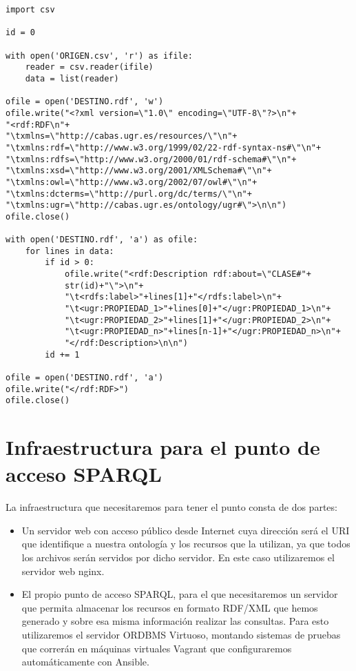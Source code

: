 \newpage
\begin{verbatim}
import csv

id = 0

with open('ORIGEN.csv', 'r') as ifile:
    reader = csv.reader(ifile)
    data = list(reader)

ofile = open('DESTINO.rdf', 'w')
ofile.write("<?xml version=\"1.0\" encoding=\"UTF-8\"?>\n"+
"<rdf:RDF\n"+
"\txmlns=\"http://cabas.ugr.es/resources/\"\n"+
"\txmlns:rdf=\"http://www.w3.org/1999/02/22-rdf-syntax-ns#\"\n"+
"\txmlns:rdfs=\"http://www.w3.org/2000/01/rdf-schema#\"\n"+
"\txmlns:xsd=\"http://www.w3.org/2001/XMLSchema#\"\n"+
"\txmlns:owl=\"http://www.w3.org/2002/07/owl#\"\n"+
"\txmlns:dcterms=\"http://purl.org/dc/terms/\"\n"+
"\txmlns:ugr=\"http://cabas.ugr.es/ontology/ugr#\">\n\n")
ofile.close()

with open('DESTINO.rdf', 'a') as ofile:
    for lines in data:
        if id > 0:
            ofile.write("<rdf:Description rdf:about=\"CLASE#"+
            str(id)+"\">\n"+
            "\t<rdfs:label>"+lines[1]+"</rdfs:label>\n"+
            "\t<ugr:PROPIEDAD_1>"+lines[0]+"</ugr:PROPIEDAD_1>\n"+
            "\t<ugr:PROPIEDAD_2>"+lines[1]+"</ugr:PROPIEDAD_2>\n"+
            "\t<ugr:PROPIEDAD_n>"+lines[n-1]+"</ugr:PROPIEDAD_n>\n"+
            "</rdf:Description>\n\n")
        id += 1

ofile = open('DESTINO.rdf', 'a')
ofile.write("</rdf:RDF>")
ofile.close()
\end{verbatim}

\newpage
\section{Infraestructura para el punto de acceso SPARQL}

La infraestructura que necesitaremos para tener el punto consta de dos partes: 

\begin{itemize}
	\item Un servidor web con acceso público desde {\sf Internet} cuya dirección será el {\sf URI} que identifique a nuestra ontología y los recursos que la utilizan, ya que todos los archivos serán servidos por dicho servidor. En este caso utilizaremos el servidor web {\sf nginx}.
	\item El propio punto de acceso {\sf SPARQL},  para el que necesitaremos un servidor que permita almacenar los recursos en formato {\sf RDF/XML} que hemos generado y sobre esa misma información realizar las consultas. Para esto utilizaremos el servidor {\sf ORDBMS} {\sf Virtuoso}, montando sistemas de pruebas que correrán en máquinas virtuales {\sf Vagrant} que configuraremos automáticamente con {\sf Ansible}.
\end{itemize}


